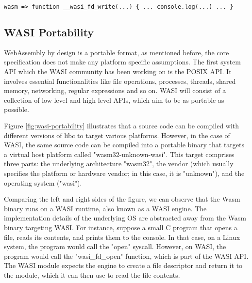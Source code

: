 \verb|wasm => function __wasi_fd_write(...) { ... console.log(...) ... }|



\subsection{WASI Portability}
\label{subsec:wasi-portability}

WebAssembly by design is a portable format, as mentioned before, the core specification does not make any platform specific assumptions. 
The first system API which the WASI community has been working on is the \gls{POSIX} API. 
It involves essential functionalities like file operations, processes, threads, 
shared memory, networking, regular expressions and so on. WASI will consist of a collection of low level and high level APIs, which aim to be as portable as possible. 

Figure \ref{fig:wasi-portability} illustrates that a source code can be compiled with different versions of libc to target various platforms. However, in the case of WASI, the same source code can be compiled into a portable binary that targets a virtual host platform called "wasm32-unknown-wasi". 
This target comprises three parts: the underlying architecture "wasm32", the vendor (which usually specifies the platform or hardware vendor; in this case, it is "unknown"), and the operating system ("wasi").

Comparing the left and right sides of the figure, we can observe that the Wasm binary runs on a WASI runtime, also known as a WASI engine. The implementation details of the underlying OS are abstracted away from the Wasm binary targeting WASI. For instance, suppose a small C program that opens a file, reads its contents, and prints them to the console. In that case, on a Linux system, the program would call the "open" syscall. 
However, on WASI, the program would call the "wasi\_fd\_open" function, which is part of the WASI API. 
The WASI module expects the engine to create a file descriptor and return it to the module, which it can then use to read the file contents.

